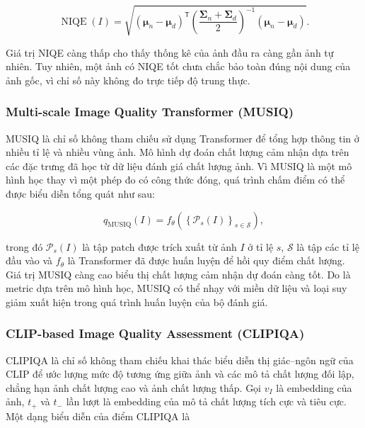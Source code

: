 \begin{equation}
\operatorname{NIQE}(I)
=\sqrt{
(\boldsymbol{\mu}_n-\boldsymbol{\mu}_d)^{\mathsf{T}}
\left(\frac{\boldsymbol{\Sigma}_n+\boldsymbol{\Sigma}_d}{2}\right)^{-1}
(\boldsymbol{\mu}_n-\boldsymbol{\mu}_d)
}.
\end{equation}

Giá trị NIQE càng thấp cho thấy thống kê của ảnh đầu ra càng gần ảnh tự nhiên.
Tuy nhiên, một ảnh có NIQE tốt chưa chắc bảo toàn đúng nội dung của ảnh gốc, vì
chỉ số này không đo trực tiếp độ trung thực.

\subsubsection{Multi-scale Image Quality Transformer (MUSIQ)}

MUSIQ \cite{ke2021musiq} là chỉ số không tham chiếu sử dụng Transformer để tổng hợp thông tin ở
nhiều tỉ lệ và nhiều vùng ảnh. Mô hình dự đoán chất lượng cảm nhận dựa trên các
đặc trưng đã học từ dữ liệu đánh giá chất lượng ảnh. Vì MUSIQ là một mô hình học
thay vì một phép đo có công thức đóng, quá trình chấm điểm có thể được biểu diễn
tổng quát như sau:

\begin{equation}
q_{\mathrm{MUSIQ}}(I)
=f_{\theta}\!\left(\left\{\mathcal{P}_{s}(I)\right\}_{s\in\mathcal{S}}\right),
\end{equation}

trong đó $\mathcal{P}_{s}(I)$ là tập patch được trích xuất từ ảnh $I$ ở tỉ lệ
$s$, $\mathcal{S}$ là tập các tỉ lệ đầu vào và $f_{\theta}$ là Transformer đã
được huấn luyện để hồi quy điểm chất lượng. Giá trị MUSIQ càng cao biểu thị chất
lượng cảm nhận dự đoán càng tốt. Do là metric dựa trên mô hình học, MUSIQ có thể
nhạy với miền dữ liệu và loại suy giảm xuất hiện trong quá trình huấn luyện của
bộ đánh giá.

\subsubsection{CLIP-based Image Quality Assessment (CLIPIQA)}

CLIPIQA \cite{wang2023clipiqa} là chỉ số không tham chiếu khai thác biểu diễn thị giác--ngôn ngữ của
CLIP để ước lượng mức độ tương ứng giữa ảnh và các mô tả chất lượng đối lập,
chẳng hạn ảnh chất lượng cao và ảnh chất lượng thấp. Gọi $v_I$ là embedding của
ảnh, $t_{+}$ và $t_{-}$ lần lượt là embedding của mô tả chất lượng tích cực và
tiêu cực. Một dạng biểu diễn của điểm CLIPIQA là

